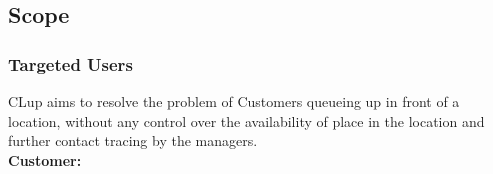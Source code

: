 



\subsection{Scope}

\subsubsection{Targeted Users}

CLup aims to resolve the problem of Customers queueing up in front of a location, without any control over the availability of place in the location and further contact tracing by the managers.
\\[0.5cm]
\textbf{Customer:} \\

